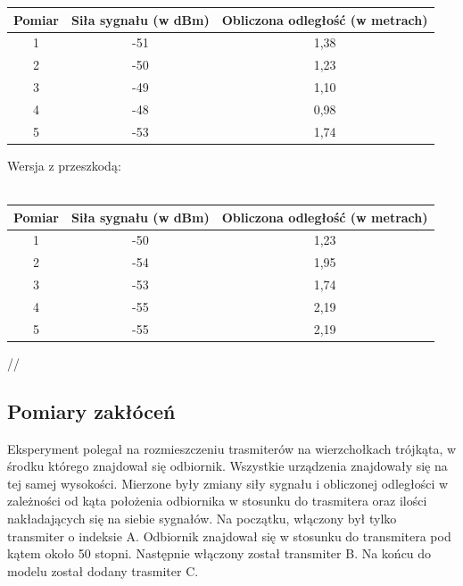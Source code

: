 \documentclass{article}
\begin{document}
\begin{itemize}
\begin{center}
\begin{minipage}{\linewidth}
				\begin{tabular}{|c|c|c|}
					\hline 
					Pomiar & Siła sygnału (w dBm) & Obliczona odległość (w metrach) \\ 
					\hline 
					1 & -51 & 1,38 \\ 
					\hline 
					2 & -50 & 1,23 \\ 
					\hline 
					3 & -49 & 1,10 \\ 
					\hline 
					4 & -48 & 0,98 \\ 
					\hline 
					5 & -53 & 1,74 \\ 
					\hline 
				\end{tabular} 
			\end{minipage} 
		\end{center}
		\begin{center}
			\begin{minipage}{\linewidth}
				Wersja z przeszkodą:\\\\
				\begin{tabular}{|c|c|c|}
					\hline 
					Pomiar & Siła sygnału (w dBm) & Obliczona odległość (w metrach) \\ 
					\hline 
					1 & -50 & 1,23 \\ 
					\hline 
					2 & -54 & 1,95 \\ 
					\hline 
					3 & -53 & 1,74 \\ 
					\hline 
					4 & -55 & 2,19 \\ 
					\hline 
					5 & -55 & 2,19 \\ 
					\hline 
				\end{tabular}//
			\end{minipage} 
		\end{center}
		\end{itemize}
		
		\subsection{Pomiary zakłóceń}
		Eksperyment polegał na rozmieszczeniu trasmiterów na wierzchołkach trójkąta, w środku którego znajdował się odbiornik. Wszystkie urządzenia znajdowały się na tej samej wysokości. Mierzone były zmiany siły sygnału i obliczonej odległości w zależności od kąta położenia odbiornika w stosunku do trasmitera oraz ilości nakładających się na siebie sygnałów. Na początku, włączony był tylko transmiter o indeksie A. Odbiornik znajdował się w stosunku do transmitera pod kątem około 50 stopni. Następnie włączony został transmiter B. Na końcu do modelu został dodany trasmiter C.\\
		
\end{document}
